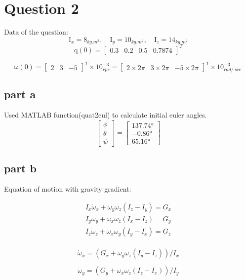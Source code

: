 \section{Question 2}
Data of the question:
$$
\mathrm{I}_x = 8_{kg.m^2},\quad \mathrm{I}_y = 10_{kg.m^2},\quad \mathrm{I}_z = 14_{kg.m^2}
$$
$$
\boldsymbol{\mathrm{q}}(0) = \begin{bmatrix}
    0.3 & 0.2 & 0.5 & 0.7874
\end{bmatrix}^T
$$

$$
\boldsymbol{\mathrm{\omega}}(0) = \begin{bmatrix}
    2 & 3 & -5
\end{bmatrix}^T \times 10^{-3}_{rps} = \begin{bmatrix}
    2\times 2\pi & 3\times 2\pi & -5\times 2\pi
\end{bmatrix}^T \times 10^{-3}_{rad/\sec}
$$

\subsection{part a}
Used MATLAB function(quat2eul) to calculate initial euler angles.
$$
\begin{bmatrix}
    \phi\\
    \theta\\
    \psi 
\end{bmatrix} = \begin{bmatrix}
  \ang{137.74}\\
  \ang{-0.86}\\
  \ang{65.16}
\end{bmatrix}
$$

\subsection{part b}
Equation of motion with gravity gradient:

\begin{align}
    I_x \dot\omega_x +  \omega_y \omega_z(I_z - I_y) = G_x\\
    I_y \dot\omega_y +  \omega_x \omega_z(I_x - I_z) = G_y\\
    I_z \dot\omega_z +  \omega_x \omega_y(I_y - I_x) = G_z\\
\end{align}

$$
\dot \omega_x = (G_x + \omega_y \omega_z(I_y - I_z))/I_x
$$

$$
\dot \omega_y = (G_y + \omega_x \omega_z(I_z - I_x))/I_y
$$

